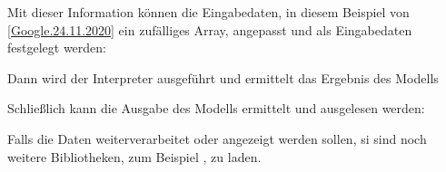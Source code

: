 \medskip



\medskip


Mit dieser Information können die Eingabedaten, in diesem Beispiel von \ref{Google.24.11.2020} ein zufälliges Array,  angepasst und als Eingabedaten festgelegt werden:

\medskip




\medskip

Dann wird der Interpreter ausgeführt und ermittelt das Ergebnis des Modells

\medskip



\medskip

Schließlich kann die Ausgabe des Modells ermittelt und ausgelesen werden:

\medskip


\medskip

Falls die Daten weiterverarbeitet oder angezeigt werden sollen, si sind noch weitere Bibliotheken, zum Beispiel , zu laden.


